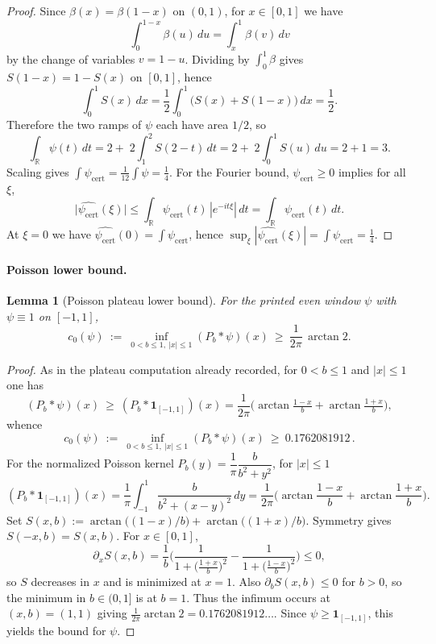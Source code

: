 \documentclass[11pt]{article}
\newtheorem{lemma}[theorem]{Lemma}
\theoremstyle{definition}
\theoremstyle{remark}
\theoremstyle{definition}
\newcommand{\R}{\mathbb{R}}
\newcommand{\Poisson}{P}
\begin{document}
\begin{proof}
Since $\beta(x)=\beta(1-x)$ on $(0,1)$, for $x\in[0,1]$ we have
\[
  \int_0^{1-x}\beta(u)\,du=\int_x^1 \beta(v)\,dv
\]
by the change of variables $v=1-u$. Dividing by $\int_0^1\beta$ gives $S(1-x)=1-S(x)$ on $[0,1]$, hence
\[
  \int_0^1 S(x)\,dx=\frac12\int_0^1\bigl(S(x)+S(1-x)\bigr)\,dx=\frac12.
\]
Therefore the two ramps of $\psi$ each have area $1/2$, so
\[
  \int_{\R}\psi(t)\,dt
  =2+\;2\!\int_1^2 S(2-t)\,dt
  =2+\;2\!\int_0^1 S(u)\,du
  =2+1=3.
\]
Scaling gives $\int\psi_{\mathrm{cert}}=\tfrac1{12}\int\psi=\tfrac14$.
For the Fourier bound, $\psi_{\mathrm{cert}}\ge 0$ implies for all $\xi$,
\[
  \big|\widehat{\psi_{\mathrm{cert}}}(\xi)\big|
  \le \int_{\R}\psi_{\mathrm{cert}}(t)\,|e^{-it\xi}|\,dt
  =\int_{\R}\psi_{\mathrm{cert}}(t)\,dt.
\]
At $\xi=0$ we have $\widehat{\psi_{\mathrm{cert}}}(0)=\int\psi_{\mathrm{cert}}$, hence $\sup_\xi|\widehat{\psi_{\mathrm{cert}}}(\xi)|=\int\psi_{\mathrm{cert}}=\tfrac14$.
\end{proof}

\paragraph{Poisson lower bound.}
\begin{lemma}[Poisson plateau lower bound]\label{lem:poisson-plateau}
For the printed even window \(\psi\) with \(\psi\equiv 1\) on \([-1,1]\),
\[ c_0(\psi)\ :=\ \inf_{0<b\le 1,\ |x|\le 1} (\Poisson_b*\psi)(x)\ \ge\ \frac{1}{2\pi}\,\arctan 2. \]
\end{lemma}
\begin{proof}
As in the plateau computation already recorded, for \(0<b\le 1\) and \(|x|\le 1\) one has
\[
 (\Poisson_b*\psi)(x)\ \ge\ (\Poisson_b*\mathbf 1_{[-1,1]})(x)
  = \frac{1}{2\pi}\Big(\arctan\tfrac{1-x}{b}+\arctan\tfrac{1+x}{b}\Big),
\]
whence
\[
 c_0(\psi)\ :=\ \inf_{0<b\le 1,\ |x|\le 1} (\Poisson_b*\psi)(x)\ \ge\ 0.1762081912\,.
\]
For the normalized Poisson kernel \(P_b(y)=\dfrac{1}{\pi}\dfrac{b}{b^2+y^2}\), for \(|x|\le 1\)
\[
 (P_b*\mathbf 1_{[-1,1]})(x)=\frac{1}{\pi}\int_{-1}^{1}\frac{b}{b^2+(x-y)^2}\,dy=\frac{1}{2\pi}\Big(\arctan\frac{1-x}{b}+\arctan\frac{1+x}{b}\Big).
\]
Set \(S(x,b):=\arctan\big((1-x)/b\big)+\arctan\big((1+x)/b\big)\). Symmetry gives \(S(-x,b)=S(x,b)\). For \(x\in[0,1]\),
\[
 \partial_x S(x,b)=\frac{1}{b}\Big(\frac{1}{1+\big(\tfrac{1+x}{b}\big)^2}-\frac{1}{1+\big(\tfrac{1-x}{b}\big)^2}\Big)\le 0,
\]
so \(S\) decreases in \(x\) and is minimized at \(x=1\). Also \(\partial_b S(x,b)\le 0\) for \(b>0\), so the minimum in \(b\in(0,1]\) is at \(b=1\). Thus the infimum occurs at \((x,b)=(1,1)\) giving \(\frac{1}{2\pi}\arctan 2=0.1762081912\ldots\). Since \(\psi\ge \mathbf 1_{[-1,1]}\), this yields the bound for \(\psi\).
\end{proof}
\end{document}
